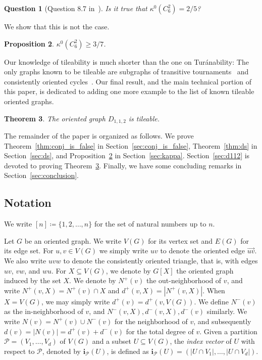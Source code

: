 \documentclass[11pt]{amsart}
\newtheorem{theorem}{Theorem}[section]
\newtheorem{question}[theorem]{Question}
\newtheorem{prop}[theorem]{Proposition}
\newcommand{\CP}{\mathcal{P}}
\begin{document}
\begin{question}[Question 8.7 in~\cite{DHLMPT}] 
    Is it true that $\kappa^0(C_6^2) = 2/5$?
\end{question}

We show that this is not the case.

\begin{prop} \label{prop:kappa}
    $\kappa^0(C_6^2) \ge 3/7$.
\end{prop}

Our knowledge of tileability is much shorter than the one on Tur\'anability: The only graphs known to be tileable are subgraphs of transitive tournaments~\cite{yuster} and consistently oriented cycles~\cite{li-molla, wang}.
Our final result, and the main technical portion of this paper, is dedicated to adding one more example to the list of known tileable oriented graphs.

\begin{theorem} \label{thm:d112}
    The oriented graph $D_{1,1,2}$ is tileable.
\end{theorem}

The remainder of the paper is organized as follows. We prove Theorem~\ref{thm:conj_is_false} in Section~\ref{sec:conj_is_false}, Theorem~\ref{thm:ds} in Section~\ref{sec:ds}, and Proposition~\ref{prop:kappa} in Section~\ref{sec:kappa}. Section~\ref{sec:d112} is devoted to proving Theorem~\ref{thm:d112}. Finally, we have some concluding remarks in Section~\ref{sec:conclusion}.

\subsection*{Notation} 
We write $[n] \coloneqq \{1,2,\dots, n\}$ for the set of natural numbers up to $n$.

Let $G$ be an oriented graph. We write $V(G)$ for its vertex set and $E(G)$ for its edge set. For $u, v \in V(G)$ we simply write $uv$ to denote the oriented edge $\overrightarrow{uv}$. We also write $uvw$ to denote the consistently oriented triangle, that is, with edges $uv$, $vw$, and $wu$. For $X \subseteq V(G)$, we denote by $G[X]$ the oriented graph induced by the set $X$. 
We denote by $N^+(v)$ the out-neighborhood of $v$, and write $N^+(v,X)=N^+(v)\cap X$ and $d^+(v,X)=|N^+(v,X)|$.
When $X=V(G)$, we may simply write $d^+(v)=d^+(v,V(G))$.
We define $N^-(v)$ as the in-neighborhood of $v$, and $N^-(v,X),d^-(v,X),d^-(v)$ similarly.
We write $N(v)=N^+(v)\cup N^-(v)$ for the neighborhood of $v$, and subsequently $d(v)=|N(v)|=d^+(v)+d^-(v)$ for the total degree of $v$.
Given a partition $\CP=(V_1,\dots,V_d)$ of $V(G)$ and a subset $U\subseteq V(G)$, the \emph{index vector} of $U$ with respect to $\CP$, denoted by $\mathbf{i}_\CP(U)$, is defined as $\mathbf{i}_\CP(U)=(|U\cap V_1|,\dots,|U\cap V_d|)$.
\end{document}
